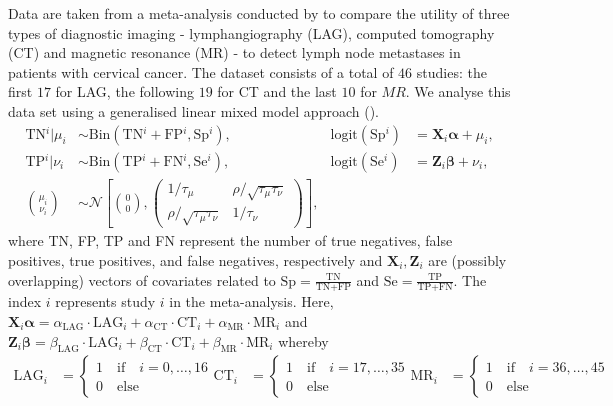 \documentclass[a4paper,11pt]{article}
\def\mm#1{\ensuremath{\boldsymbol{#1}}} %
\begin{document}
 Data are taken from a meta-analysis conducted by \cite{bivariate3}
    to compare the utility of three types of diagnostic imaging -
    lymphangiography (LAG), computed tomography (CT) and magnetic
    resonance (MR) - to detect lymph node metastases in patients with
    cervical cancer. The dataset consists of a total of $46$ studies:
    the first $17$ for LAG, the following $19$ for CT and the last
    $10$ for $MR$. We analyse this data set using a generalised linear
    mixed model approach (\cite{bivariate1}).
    \begin{align}
        \text{TN}{^i}|\mu_i &\sim \text{Bin}(\text{TN}{^i} +
        \text{FP}{^i}, \text{Sp}{^i}),&
        \text{logit}(\text{Sp}{^i}) &= \mm{X}_i \mm{\alpha} + \mu_i,\\
        \text{TP}{^i}|\nu_i &\sim \text{Bin}(\text{TP}{^i} +
        \text{FN}{^i}, \text{Se}{^i}),&
        \text{logit}(\text{Se}{^i}) &= \mm{Z}_i \mm{\beta} + \nu_i,\\[0.3cm]
        {\mu_i \choose \nu_i} &\sim \mathcal{N} \left[ {0 \choose 0},
          \begin{pmatrix} 1/\tau_\mu & \rho/\sqrt{\tau_\mu \tau_\nu} \\
              \rho/\sqrt{\tau_\mu \tau_\nu} & 1/\tau_\nu
          \end{pmatrix}
        \right], \label{eq:biv}
    \end{align}
    where TN, FP, TP and FN represent the number of true negatives,
    false positives, true positives, and false negatives, respectively
    and $\mm{X}_i, \mm{Z}_i$ are (possibly overlapping) vectors of
    covariates related to $\text{Sp} = \tfrac{\text{TN}}{\text{TN} +
        \text{FP}}$ and $\text{Se} = \tfrac{\text{TP}}{\text{TP} +
        \text{FN}}$.  The index $i$ represents study $i$ in the
    meta-analysis.  Here, $\mm{X}_i \mm{\alpha} =
    \alpha_{\text{LAG}}\cdot \text{LAG}_i + \alpha_{\text{CT}} \cdot
    \text{CT}_i + \alpha_{\text{MR}} \cdot \text{MR}_i$ and $\mm{Z}_i
    \mm{\beta} = \beta_{\text{LAG}} \cdot \text{LAG}_i +
    \beta_{\text{CT}} \cdot \text{CT}_i + \beta_{\text{MR}} \cdot
    \text{MR}_i$ whereby
    \begin{align*}
        \text{LAG}_i &=
        \begin{cases}
            1 \quad \text{if} \quad i = 0, \ldots, 16\\
            0 \quad \text{else}
        \end{cases}
        \text{CT}_i &=
        \begin{cases}
            1 \quad \text{if} \quad i = 17, \ldots, 35\\
            0 \quad \text{else}
        \end{cases}
        \text{MR}_i &=
        \begin{cases}
            1 \quad \text{if} \quad i = 36, \ldots, 45\\
            0 \quad \text{else}
        \end{cases}
    \end{align*}
\end{document}
